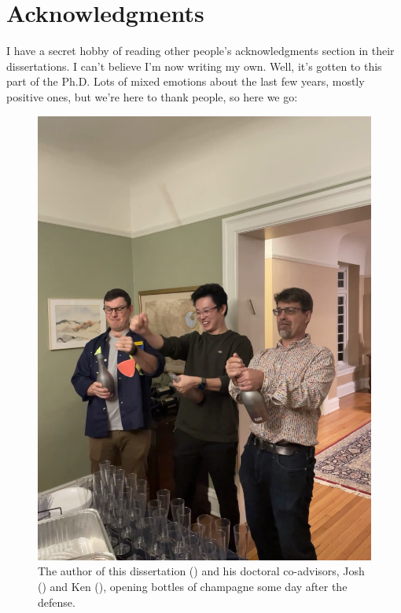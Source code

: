 \chapter*{Acknowledgments}

I have a secret hobby of reading other people's acknowledgments section in their dissertations. I can't believe I'm now writing my own. Well, it's gotten to this part of the Ph.D. Lots of mixed emotions about the last few years, mostly positive ones, but we're here to thank people, so here we go:

\setlength{\intextsep}{0em}
\begin{figure}
  \includegraphics[width=\linewidth]{assets/josh-and-ken.png}
  \vspace{-.5\baselineskip}\caption{The author of this dissertation () and his doctoral co-advisors, Josh () and Ken (), opening bottles of champagne some day after the defense.\label{fig:josh-and-ken}}
\end{figure}
